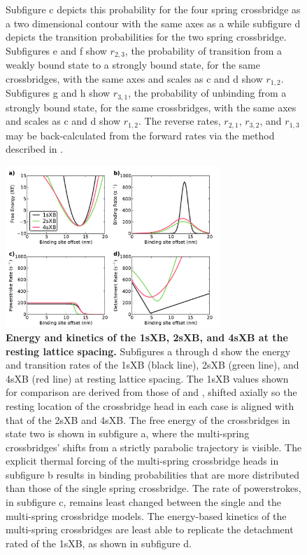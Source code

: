\documentclass[]{article}
\begin{document}
\begin{figure}[htbp]
\begin{center}
{        Subfigure c depicts this probability for the four spring crossbridge as a two dimensional contour with the same axes as a while subfigure d depicts the transition probabilities for the two spring crossbridge.
        Subfigures e and f show $r_{2,3}$, the probability of transition from a weakly bound state to a strongly bound state, for the same crossbridges, with the same axes and scales as c and d show $r_{1,2}$.
        Subfigures g and h show $r_{3,1}$, the probability of unbinding from a strongly bound state, for the same crossbridges, with the same axes and scales as c and d show $r_{1,2}$.
        The reverse rates, $r_{2,1}$, $r_{3,2}$, and $r_{1,3}$ may be back-calculated from the forward rates via the method described in \cite{Tanner:2007:pe115}.
    }
    \end{center}
\end{figure}

\begin{figure}[htbp]
    \begin{center}
    \includegraphics[width=3.2in]{../imgs/Figure3.pdf}
    \caption{
        \label{fig_kinetics_cuts}
        \textbf{Energy and kinetics of the 1sXB, 2sXB, and 4sXB at the resting lattice spacing.}
        Subfigures a through d show the energy and transition rates of the 1sXB (black line), 2sXB (green line), and 4sXB (red line) at resting lattice spacing.
        The 1sXB values shown for comparison are derived from those of \citet{Daniel1998} and \citet{Tanner:2007:pe115}, shifted axially so the resting location of the crossbridge head in each case is aligned with that of the 2sXB and 4sXB. 
        The free energy of the crossbridges in state two is shown in subfigure a, where the multi-spring crossbridges' shifts from a strictly parabolic trajectory is visible.
        The explicit thermal forcing of the multi-spring crossbridge heads in subfigure b results in binding probabilities that are more distributed than those of the single spring crossbridge.
        The rate of powerstrokes, in subfigure c, remains least changed between the single and the multi-spring crossbridge models.
        The energy-based kinetics of the multi-spring crossbridges are least able to replicate the detachment rated of the 1sXB, as shown in subfigure d. 
    }
    \end{center}
\end{figure}
\end{document}
